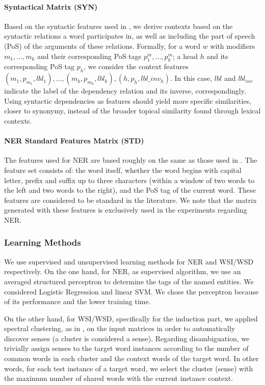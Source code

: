\paragraph{Syntactical Matrix (SYN)}
Based on the syntactic features used in   \cite{LevyG14,Panchenko2017}, we derive contexts based on the syntactic relations a word participates in, as well as including the part of speech (PoS) of the arguments of these relations. Formally, for a word $w$ with modifiers $m_1, \dots, m_k$ and their corresponding PoS tags $p^m_1, \dots, p^m_k$; a head $h$ and its corresponding PoS tag $p_h$, we consider the context features $(m_1, p_{m_1}, lbl_1), \dots, \allowbreak (m_k, p_{m_k}, lbl_k), \allowbreak (h,p_h,lbl\_inv_h)$. In this case, $lbl$ and $lbl_{inv}$ indicate the label of the dependency relation and its inverse, correspondingly. Using syntactic dependencies as features should yield more specific similarities, closer to synonymy, instead of the broader topical similarity found through lexical contexts.
\paragraph{NER Standard Features Matrix (STD)}
The features used for NER are based roughly on the same as those used in \cite{Daume2006,Balasuriya2009}. The feature set consists of: the word itself, whether the word begins with capital letter, prefix and suffix up to three characters (within a window of two words to the left and two words to the right), and the PoS tag of the current word. These features are considered to be standard in the literature. We note that the matrix generated with these features is exclusively used in the experiments regarding NER.	

\subsubsection{Learning Methods}
We use supervised and unsupervised learning methods for NER and WSI/WSD respectively. On the one hand, for NER, as supervised algorithm, we use an averaged structured perceptron \cite{Collins2002,Daume2006} to determine the tags of the named entities. We considered Logistic Regression and linear SVM. We chose the perceptron because of its performance and the lower training time.

On the other hand, for WSI/WSD, specifically for the induction part, we applied spectral clustering, as in  \cite{GoyalH14}, on the input matrices in order to automatically discover senses (a cluster is considered a sense). Regarding disambiguation, we trivially assign senses to the target word instances according to the number of common words in each cluster and the context words of the target word. In other words, for each test instance of a target word, we select the cluster (sense) with the maximum number of shared words with the current instance context.



